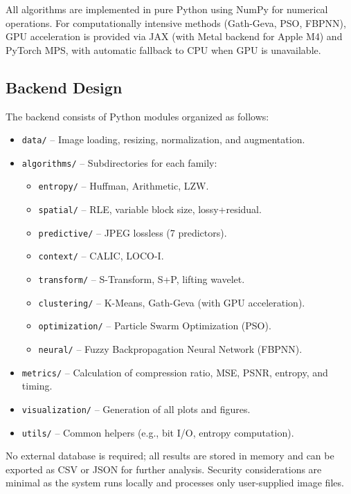 All algorithms are implemented in pure Python using NumPy for numerical operations. For computationally intensive methods (Gath-Geva, PSO, FBPNN), GPU acceleration is provided via JAX (with Metal backend for Apple M4) and PyTorch MPS, with automatic fallback to CPU when GPU is unavailable.

\subsection{Backend Design}

The backend consists of Python modules organized as follows:

\begin{itemize}
    \item \texttt{data/} – Image loading, resizing, normalization, and augmentation.
    
    \item \texttt{algorithms/} – Subdirectories for each family:
    \begin{itemize}
        \item \texttt{entropy/} – Huffman, Arithmetic, LZW.
        \item \texttt{spatial/} – RLE, variable block size, lossy+residual.
        \item \texttt{predictive/} – JPEG lossless (7 predictors).
        \item \texttt{context/} – CALIC, LOCO-I.
        \item \texttt{transform/} – S-Transform, S+P, lifting wavelet.
        \item \texttt{clustering/} – K-Means, Gath-Geva (with GPU acceleration).
        \item \texttt{optimization/} – Particle Swarm Optimization (PSO).
        \item \texttt{neural/} – Fuzzy Backpropagation Neural Network (FBPNN).
    \end{itemize}
    
    \item \texttt{metrics/} – Calculation of compression ratio, MSE, PSNR, entropy, and timing.
    
    \item \texttt{visualization/} – Generation of all plots and figures.
    
    \item \texttt{utils/} – Common helpers (e.g., bit I/O, entropy computation).
\end{itemize}

No external database is required; all results are stored in memory and can be exported as CSV or JSON for further analysis. Security considerations are minimal as the system runs locally and processes only user-supplied image files.

